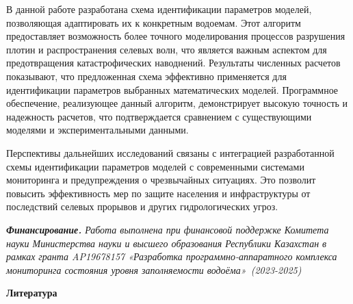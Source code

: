 \begin{multicols}{2}
В данной работе разработана схема идентификации параметров моделей,
позволяющая адаптировать их к конкретным водоемам. Этот алгоритм
предоставляет возможность более точного моделирования процессов
разрушения плотин и распространения селевых волн, что является важным
аспектом для предотвращения катастрофических наводнений. Результаты
численных расчетов показывают, что предложенная схема эффективно
применяется для идентификации параметров выбранных математических
моделей. Программное обеспечение, реализующее данный алгоритм,
демонстрирует высокую точность и надежность расчетов, что подтверждается
сравнением с существующими моделями и экспериментальными данными.

Перспективы дальнейших исследований связаны с интеграцией разработанной
схемы идентификации параметров моделей с современными системами
мониторинга и предупреждения о чрезвычайных ситуациях. Это позволит
повысить эффективность мер по защите населения и инфраструктуры от
последствий селевых прорывов и других гидрологических угроз.

\emph{{\bfseries Финансирование.} Работа выполнена при финансовой поддержке
Комитета науки Министерства науки и высшего образования Республики
Казахстан в рамках гранта AP19678157 «Разработка программно-аппаратного
комплекса мониторинга состояния уровня заполняемости
водоёма»~(2023-2025)}
\end{multicols}

\begin{center}
{\bfseries Литература}
\end{center}

